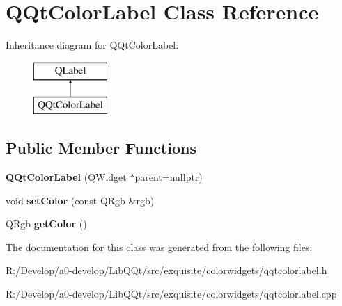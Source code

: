 \hypertarget{class_q_qt_color_label}{}\section{Q\+Qt\+Color\+Label Class Reference}
\label{class_q_qt_color_label}
Inheritance diagram for Q\+Qt\+Color\+Label\+:\begin{figure}[H]
\begin{center}
\leavevmode
\includegraphics[height=2.000000cm]{class_q_qt_color_label}
\end{center}
\end{figure}
\subsection*{Public Member Functions}
\begin{DoxyCompactItemize}
\item 
\mbox{\label{class_q_qt_color_label_a03ce07171583847086e7e1d970501796}} 
{\bfseries Q\+Qt\+Color\+Label} (Q\+Widget $\ast$parent=nullptr)
\item 
\mbox{\label{class_q_qt_color_label_ad7a064402415bbabe10f66bffc2df6a7}} 
void {\bfseries set\+Color} (const Q\+Rgb \&rgb)
\item 
\mbox{\label{class_q_qt_color_label_af89184459bf91a04906f079d87ca6162}} 
Q\+Rgb {\bfseries get\+Color} ()
\end{DoxyCompactItemize}


The documentation for this class was generated from the following files\+:\begin{DoxyCompactItemize}
\item 
R\+:/\+Develop/a0-\/develop/\+Lib\+Q\+Qt/src/exquisite/colorwidgets/qqtcolorlabel.\+h\item 
R\+:/\+Develop/a0-\/develop/\+Lib\+Q\+Qt/src/exquisite/colorwidgets/qqtcolorlabel.\+cpp\end{DoxyCompactItemize}
